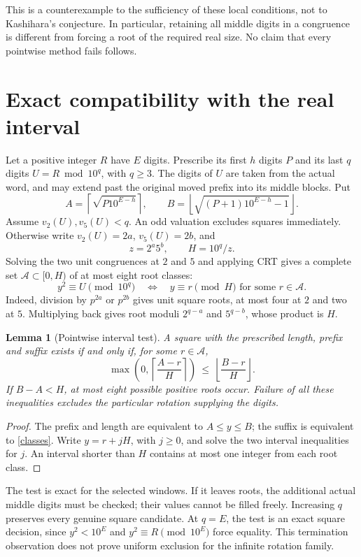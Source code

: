 \documentclass[9pt]{extarticle}
\newtheorem{lemma}[theorem]{Lemma}
\begin{document}
This is a counterexample to the sufficiency of these local conditions,
not to Kashihara's conjecture. In particular, retaining all middle
digits in a congruence is different from forcing a root of the required
real size. No claim that every pointwise method fails follows.

\section{Exact compatibility with the real interval}
Let a positive integer $R$ have $E$ digits. Prescribe its first $h$
digits $P$ and its last $q$ digits $U=R\bmod10^q$, with $q\ge3$.
The digits of $U$ are taken from the actual word, and may extend past
the original moved prefix into its middle blocks. Put
\[
 A=\left\lceil\sqrt{P10^{E-h}}\right\rceil,
 \qquad B=\left\lfloor\sqrt{(P+1)10^{E-h}-1}\right\rfloor.
\]
Assume $v_2(U),v_5(U)<q$. An odd valuation excludes squares immediately.
Otherwise write $v_2(U)=2a$, $v_5(U)=2b$, and
\[
 z=2^a5^b,\qquad H=10^q/z.
\]
Solving the two unit congruences at $2$ and $5$ and applying CRT gives
a complete set $\mathcal A\subset[0,H)$ of at most eight root classes:
\begin{equation}\label{classes}
 y^2\equiv U\pmod{10^q}\quad\Longleftrightarrow\quad
 y\equiv r\pmod H\text{ for some }r\in\mathcal A.
\end{equation}
Indeed, division by $p^{2a}$ or $p^{2b}$ gives unit square roots, at most
four at $2$ and two at $5$. Multiplying back gives root moduli
$2^{q-a}$ and $5^{q-b}$, whose product is $H$.

\begin{lemma}[Pointwise interval test]\label{test}
A square with the prescribed length, prefix and suffix exists if and
only if, for some $r\in\mathcal A$,
\[
 \max\left(0,\left\lceil\frac{A-r}{H}\right\rceil\right)
 \ \le\ \left\lfloor\frac{B-r}{H}\right\rfloor.
\]
If $B-A<H$, at most eight possible positive roots occur. Failure of all
these inequalities excludes the particular rotation supplying the digits.
\end{lemma}
\begin{proof}
The prefix and length are equivalent to $A\le y\le B$; the suffix is
equivalent to \eqref{classes}. Write $y=r+jH$, with $j\ge0$, and solve
the two interval inequalities for $j$. An interval shorter than $H$
contains at most one integer from each root class.
\end{proof}

The test is exact for the selected windows. If it leaves roots, the
additional actual middle digits must be checked; their values cannot be
filled freely. Increasing $q$ preserves every genuine square candidate.
At $q=E$, the test is an exact square decision, since $y^2<10^E$ and
$y^2\equiv R\pmod{10^E}$ force equality. This termination observation
does not prove uniform exclusion for the infinite rotation family.
\end{document}
